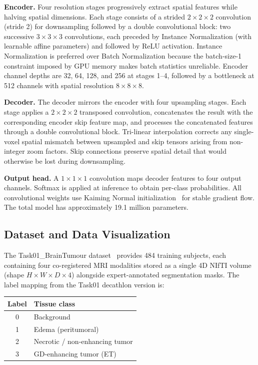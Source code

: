 \documentclass[10pt,twocolumn]{article}
\begin{document}
\textbf{Encoder.} Four resolution stages progressively extract
spatial features while halving spatial dimensions. Each stage
consists of a strided $2 \times 2 \times 2$ convolution (stride
2) for downsampling followed by a double convolutional block: two
successive $3 \times 3 \times 3$ convolutions, each preceded by
Instance Normalization (with learnable affine parameters) and
followed by ReLU activation. Instance Normalization is preferred
over Batch Normalization because the batch-size-1 constraint
imposed by GPU memory makes batch statistics unreliable. Encoder
channel depths are 32, 64, 128, and 256 at stages 1--4, followed
by a bottleneck at 512 channels with spatial resolution $8 \times
8 \times 8$.

\textbf{Decoder.} The decoder mirrors the encoder with four
upsampling stages. Each stage applies a $2 \times 2 \times 2$
transposed convolution, concatenates the result with the
corresponding encoder skip feature map, and processes the
concatenated features through a double convolutional block.
Tri-linear interpolation corrects any single-voxel spatial
mismatch between upsampled and skip tensors arising from
non-integer zoom factors. Skip connections preserve spatial
detail that would otherwise be lost during downsampling.

\textbf{Output head.} A $1 \times 1 \times 1$ convolution maps
decoder features to four output channels. Softmax is applied at
inference to obtain per-class probabilities. All convolutional
weights use Kaiming Normal initialization~\cite{he2015} for
stable gradient flow. The total model has approximately 19.1
million parameters.

\subsection{Dataset and Data Visualization}

The Task01\_BrainTumour dataset~\cite{simpson2019} provides 484
training subjects, each containing four co-registered MRI
modalities stored as a single 4D NIfTI volume (shape $H \times W
\times D \times 4$) alongside expert-annotated segmentation masks.
The label mapping from the Task01 decathlon version is:

\begin{center}
\small
\begin{tabular}{cl}
\toprule
\textbf{Label} & \textbf{Tissue class} \\
\midrule
0 & Background \\
1 & Edema (peritumoral) \\
2 & Necrotic / non-enhancing tumor \\
3 & GD-enhancing tumor (ET) \\
\bottomrule
\end{tabular}
\end{center}
\end{document}
